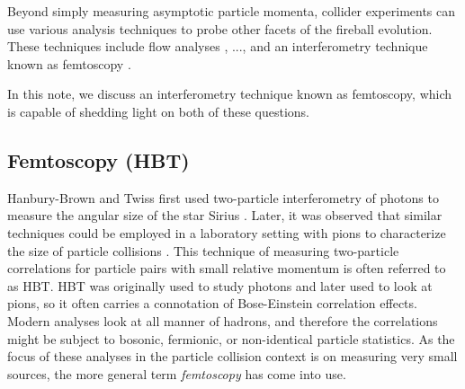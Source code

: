 




% 


Beyond simply measuring asymptotic particle momenta, collider experiments can use various analysis techniques to probe other facets of the fireball evolution.
These techniques include flow analyses \cite{...}, ..., and an interferometry technique known as femtoscopy \cite{...}.




In this note, we discuss an interferometry technique known as femtoscopy, which is capable of shedding light on both of these questions.




\subsection{Femtoscopy (HBT)}

Hanbury-Brown and Twiss first used two-particle interferometry of photons to measure the angular size of the star Sirius \cite{HanburyBrown:1956bqd}.
Later, it was observed that similar techniques could be employed in a laboratory setting with pions to characterize the size of particle collisions \cite{Goldhaber:1960sf}.
This technique of measuring two-particle correlations for particle pairs with small relative momentum is often referred to as HBT.
HBT was originally used to study photons and later used to look at pions, so it often carries a connotation of Bose-Einstein correlation effects.
Modern analyses look at all manner of hadrons, and therefore the correlations might be subject to bosonic, fermionic, or non-identical particle statistics.
As the focus of these analyses in the particle collision context is on measuring very small sources, the more general term \textit{femtoscopy} has come into use.

